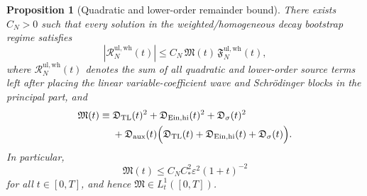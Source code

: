 \documentclass[11pt]{article}
\newtheorem{proposition}{Proposition}
\begin{document}
\begin{proposition}[Quadratic and lower-order remainder bound]
\label{prop:remainder}
There exists \(C_N>0\) such that every solution in the weighted/homogeneous decay bootstrap regime satisfies
\begin{equation}
|\mathcal R_N^{\mathrm{ul,wh}}(t)|
\le
C_N\,\mathfrak M(t)\,\mathfrak F_N^{\mathrm{ul,wh}}(t),
\label{eq:Rbound}
\end{equation}
where \(\mathcal R_N^{\mathrm{ul,wh}}(t)\) denotes the sum of all quadratic and lower-order source terms left after placing the linear variable-coefficient wave and Schr\"odinger blocks in the principal part, and
\begin{align}
\mathfrak M(t)
\equiv\;&
\mathfrak D_{\mathrm{TL}}(t)^2
+ \mathfrak D_{\mathrm{Ein,hi}}(t)^2
+ \mathfrak D_\sigma(t)^2
\nonumber\\
&+
\mathfrak D_{\mathrm{aux}}(t)\Bigl(
\mathfrak D_{\mathrm{TL}}(t)
+ \mathfrak D_{\mathrm{Ein,hi}}(t)
+ \mathfrak D_\sigma(t)
\Bigr).
\label{eq:Mdef}
\end{align}
In particular,
\begin{equation}
\mathfrak M(t)\le C_N C_\ast^2\varepsilon^2(1+t)^{-2}
\label{eq:Mrate}
\end{equation}
for all \(t\in[0,T]\), and hence \(\mathfrak M\in L_t^1([0,T])\).
\end{proposition}
\end{document}

